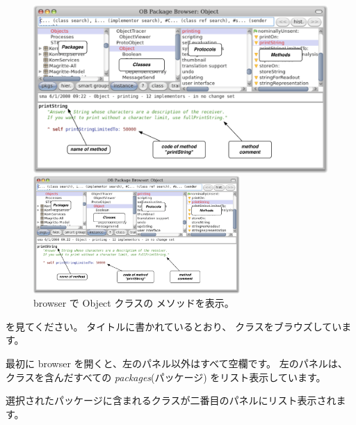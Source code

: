 \documentclass[a4paper,10pt,twoside]{book}
\begin{document}

\begin{figure}[htb]
\ifluluelse
	{\centerline {\includegraphics[width=\textwidth]{ClassBrowser1}}}
	{\centerline {\includegraphics[width=0.7\textwidth]{ClassBrowser1}}}
\caption{browser で Object クラスの  メソッドを表示。
}
\end{figure}

 を見てください。
タイトルに書かれているとおり、 クラスをブラウズしています。

最初に browser を開くと、左のパネル以外はすべて空欄です。
左のパネルは、クラスを含んだすべての \emph{packages}(パッケージ) をリスト表示しています。

選択されたパッケージに含まれるクラスが二番目のパネルにリスト表示されます。
\end{document}
